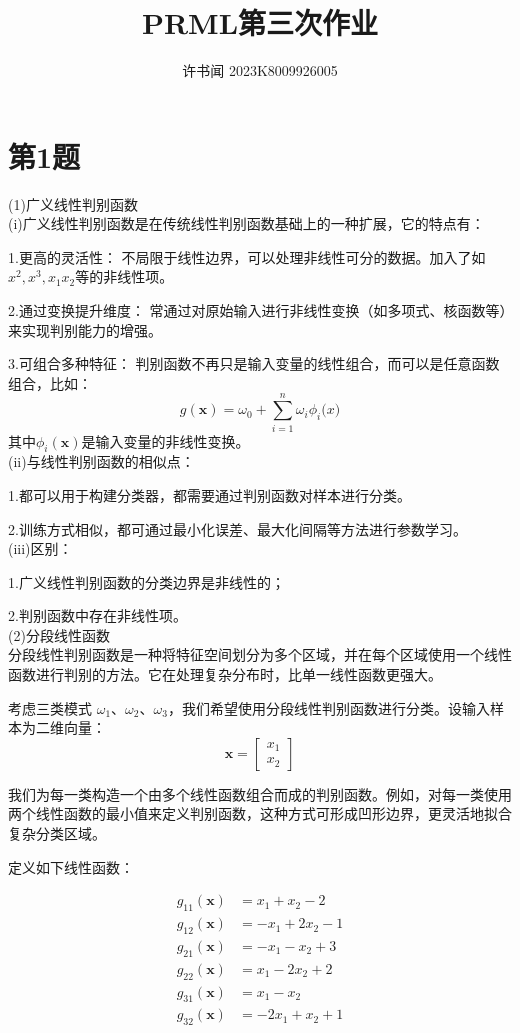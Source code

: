 \documentclass{article}
\begin{document}
\title{PRML第三次作业}
\author{许书闻 2023K8009926005}
\maketitle

\section*{第1题}
(1)广义线性判别函数\\
(i)广义线性判别函数是在传统线性判别函数基础上的一种扩展，它的特点有：

1.更高的灵活性：
不局限于线性边界，可以处理非线性可分的数据。加入了如\(x^2,x^3,x_{1}x_{2}\)等的非线性项。

2.通过变换提升维度：
常通过对原始输入进行非线性变换（如多项式、核函数等）来实现判别能力的增强。

3.可组合多种特征：
判别函数不再只是输入变量的线性组合，而可以是任意函数组合，比如：
\[g(\boldsymbol{x})=\omega_{0}+\sum_{i=1}^{n}\omega_{i}\phi_{i}\boldsymbol(x)\]
其中\(\phi_{i}(\boldsymbol{x})\)是输入变量的非线性变换。\\
(ii)与线性判别函数的相似点：

1.都可以用于构建分类器，都需要通过判别函数对样本进行分类。

2.训练方式相似，都可通过最小化误差、最大化间隔等方法进行参数学习。\\
(iii)区别：

1.广义线性判别函数的分类边界是非线性的；

2.判别函数中存在非线性项。\\
(2)分段线性函数\\
分段线性判别函数是一种将特征空间划分为多个区域，并在每个区域使用一个线性函数进行判别的方法。它在处理复杂分布时，比单一线性函数更强大。

考虑三类模式 $\omega_1$、$\omega_2$、$\omega_3$，我们希望使用分段线性判别函数进行分类。设输入样本为二维向量：
\[
\mathbf{x} = \begin{bmatrix} x_1 \\ x_2 \end{bmatrix}
\]

我们为每一类构造一个由多个线性函数组合而成的判别函数。例如，对每一类使用两个线性函数的最小值来定义判别函数，这种方式可形成凹形边界，更灵活地拟合复杂分类区域。

定义如下线性函数：

\begin{align*}
g_{11}(\mathbf{x}) &= x_1 + x_2 - 2 \\
g_{12}(\mathbf{x}) &= -x_1 + 2x_2 - 1 \\
g_{21}(\mathbf{x}) &= -x_1 - x_2 + 3 \\
g_{22}(\mathbf{x}) &= x_1 - 2x_2 + 2 \\
g_{31}(\mathbf{x}) &= x_1 - x_2 \\
g_{32}(\mathbf{x}) &= -2x_1 + x_2 + 1
\end{align*}
\end{document}
